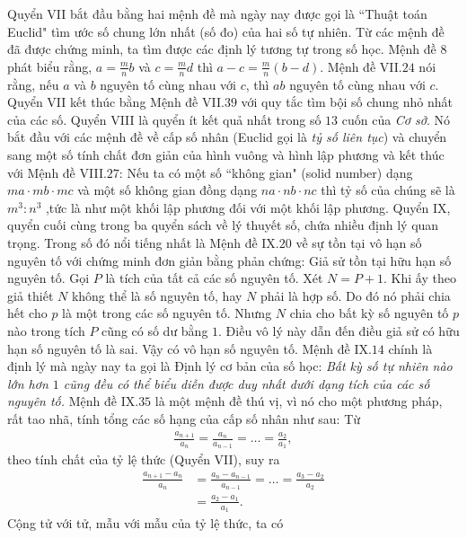 \begin{multicols}{2}
	\vskip 0.1cm
	Quyển VII bắt đầu bằng hai mệnh đề mà ngày nay được gọi là ``Thuật toán Euclid" tìm ước số chung lớn nhất (số đo) của hai số tự nhiên.
	\vskip 0.1cm
	Từ các mệnh đề đã được chứng minh, ta tìm được các định lý tương tự trong số học. Mệnh đề $8$ phát biểu rằng, $a = \frac{m}{n} b$ và $c = \frac{m}{n} d$ thì $a - c = \frac{m}{n} (b - d)$.  Mệnh đề VII.$24$ nói rằng, nếu $a$ và $b$  nguyên tố cùng nhau với $c$,  thì  $ab$ nguyên tố cùng nhau với $c$.  Quyển VII kết thúc bằng Mệnh đề VII.$39$ với quy tắc tìm bội số chung nhỏ nhất của các số.
	\vskip 0.1cm
	Quyển VIII là quyển ít kết quả nhất trong số $13$ cuốn của \textit{Cơ sở}. Nó bắt đầu với các mệnh đề về cấp số nhân (Euclid gọi là \textit{tỷ số liên tục}) và chuyển sang một số tính chất đơn giản của hình vuông và hình lập phương và kết thúc với Mệnh đề VIII.$27$: Nếu ta có một số ``không gian" (solid number) dạng $ma \cdot mb \cdot mc$  và một số không gian đồng dạng  $na \cdot nb \cdot nc$ thì tỷ số của chúng sẽ là  $m^3 : n^3$ ,tức là như một khối lập phương đối với một khối lập phương.
	\vskip 0.1cm
	Quyển IX, quyển cuối cùng trong ba quyển sách về lý thuyết số, chứa nhiều định lý quan trọng. Trong số đó nổi tiếng nhất là Mệnh đề IX.$20$ về sự tồn tại vô hạn số nguyên tố với chứng minh đơn giản bằng phản chứng: Giả sử tồn tại hữu hạn số nguyên tố. Gọi $P$ là tích của tất cả các số nguyên tố. Xét $N = P + 1$.  Khi ấy theo giả thiết $N$  không thể là số nguyên tố, hay $N$  phải là hợp số. Do đó nó phải chia hết cho $p$  là một trong các số nguyên tố. Nhưng $N$  chia cho bất kỳ số nguyên tố $p$  nào trong tích  $P$ cũng có số dư bằng $1$. Điều vô lý này dẫn đến điều giả sử có hữu hạn số nguyên tố là sai. Vậy có vô hạn số nguyên tố.
	\vskip 0.1cm
	Mệnh đề IX.$14$ chính là định lý mà ngày nay ta gọi là Định lý cơ bản của số học: \textit{Bất kỳ số tự nhiên nào lớn hơn $1$ cũng đều có thể biểu diễn được duy nhất dưới dạng tích của các số nguyên tố.}
	\vskip 0.1cm
	Mệnh đề IX.$35$ là một mệnh đề thú vị, vì nó cho một phương pháp, rất tao nhã, tính tổng các số hạng của cấp số nhân như sau: Từ
	\begin{align*}
		\frac{a_{n+1}}{a_n} = \frac{a_n}{a_{n-1}} = \ldots= \frac{a_2}{a_1},
	\end{align*}
	theo tính chất của tỷ lệ thức (Quyển VII), suy ra
	\begin{align*}
		\frac{a_{n+1} - a_n}{a_n} &= \frac{a_n - a_{n-1}}{a_{n-1}} = \ldots = \frac{a_3 - a_2}{a_2} \\
		&= \frac{a_2 - a_1}{a_1}.		
	\end{align*}
	Cộng tử với tử, mẫu với mẫu của tỷ lệ thức, ta có

\end{multicols}
